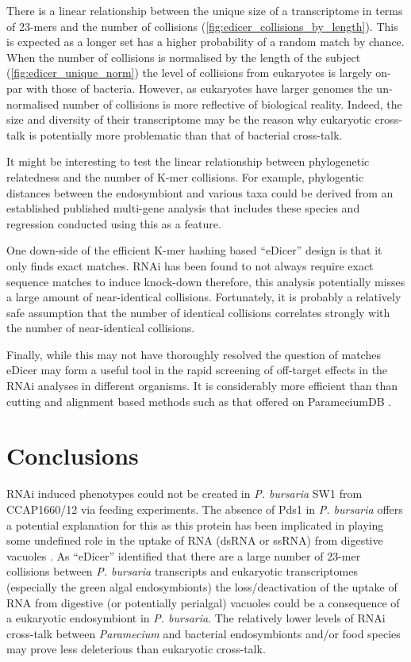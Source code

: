 There is a linear relationship between the unique size of a transcriptome
in terms of 23-mers and the number of collisions (\cref{fig:edicer_collisions_by_length}).  
This is expected
as a longer set has a higher probability of a random match by chance.
When the number of collisions is normalised by the length of the subject (\cref{fig:edicer_unique_norm})
the level of collisions from eukaryotes is largely on-par with
those of bacteria.  However, as eukaryotes have larger genomes
the un-normalised number of collisions is more reflective of biological
reality.  Indeed, the size and diversity of their transcriptome
may be the reason why eukaryotic cross-talk is potentially
more problematic than that of bacterial cross-talk.


It might be interesting to test the linear relationship between phylogenetic
relatedness and the number of K-mer collisions.  For example, phylogentic distances
between the endosymbiont and various taxa could be derived from an established
published multi-gene analysis that includes these species and regression
conducted using this as a feature. 

One down-side of the efficient K-mer hashing based ``eDicer'' design is that
it only finds exact matches.  RNAi has been found to not always require exact
sequence matches to induce knock-down \citep{Elbashir2001} therefore,
this analysis potentially misses a large amount of near-identical collisions.
Fortunately, it is probably a relatively safe assumption that the number
of identical collisions correlates strongly with the number of near-identical collisions.

Finally, while this may not have thoroughly resolved the question of matches
eDicer may form a useful tool in the rapid screening of off-target effects
in the RNAi analyses in different organisms.   It is considerably
more efficient than than cutting and alignment based methods such as that
offered on ParameciumDB \citep{Arnaiz2011}.

\section{Conclusions}

RNAi induced phenotypes could not be created in \textit{P. bursaria} SW1 from CCAP1660/12
via feeding experiments.  The absence of Pds1 in \textit{P. bursaria} offers a potential 
explanation for this as this protein has been implicated in playing some undefined role
in the uptake of RNA (dsRNA or ssRNA) from digestive vacuoles \citep{Carradec2015}.
As ``eDicer'' identified that there are a large number of 23-mer collisions
between \textit{P. bursaria} transcripts and eukaryotic transcriptomes (especially
the green algal endosymbionts) the loss/deactivation of the uptake of RNA from 
digestive (or potentially perialgal) vacuoles could be a consequence of 
a eukaryotic endosymbiont in \textit{P. bursaria}.  
The relatively lower levels of RNAi cross-talk between
\textit{Paramecium} and bacterial endosymbionts and/or food species may prove
less deleterious than eukaryotic cross-talk. 

